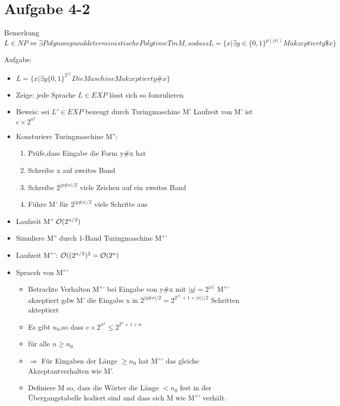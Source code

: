 \documentclass[12pt, oneside, a4paper, numbers=enddot, abstracton, parskip=full]{scrreprt}
\begin{document}
\section{Aufgabe 4-2}
Bemerkung
\begin{math}
  L\in NP \Leftrightarrow \exists Polynom p und deterministische
  Polytime Tm M,so dass
  L = \{x | \exists y \in \{0,1\}^{p(|x|)} M akzeptiert y \$ x \}
\end{math}

Aufgabe:
\begin{itemize}
\item \begin{math}
  L=\{ x | \exists y \{0,1\} ^ {2^{|x|}} Die Maschine M akzeptiert y
  \# x \}
\end{math}
\item Zeige: jede Sprache $L\in EXP $ lässt sich so fomrulieren
\item Beweis: sei $L' \in EXP$ bezeugt durch Turingmaschine M' Laufzeit von M' ist
  $ c \times 2 ^ {n^k}$

\item Konsturiere Turingmaschine M'':
  \begin{enumerate}
  \item Prüfe,dass Eingabe die Form y\#x hat
  \item Schreibe x auf zweites Band
  \item Schreibe $2^{|y\#x|/2}$ viele Zeichen auf ein zweites Band
  \item Führe M' für $2^{|y\#x|/2}$ viele Schritte aus
  \end{enumerate}
\item Laufzeit M'' $\mathcal{O} (2^{n/2}) $
\item Simuliere M'' durch 1-Band Turingmaschine M'''
\item Laufzeit M''': $\mathcal{O} ((2^{n/2})^2 = \mathcal{O} (2^n)$
\item Spraceh von M'''
  \begin{itemize}
  \item Betrachte Verhalten M''' bei Eingabe von y\#x mit
    $|y| =2^{|x|}$ M''' akzeptiert gdw M' die Eingabe x in
    $2^{|y\#x|/2} = 2^{2^{|x|} +1+|x|)/2}$ Schritten akteptiert
  \item Es gibt $n_0$,so dass $c\times2^{n^k} \leq  2^{2^n +1+n}$
  \item für alle $n\geq n_0$
  \item $\Rightarrow$ Für Eingaben der Länge $\geq n_0$ hat M''' das
    gleiche Akzeptantverhalten wie M'.            %
  \item Definiere M so, dass die Wörter die Länge $< n_0$  fest in der
    Übergangstabelle kodiert sind und dass sich M wie M''' verhält.
  \end{itemize}
\end{itemize}
\end{document}
